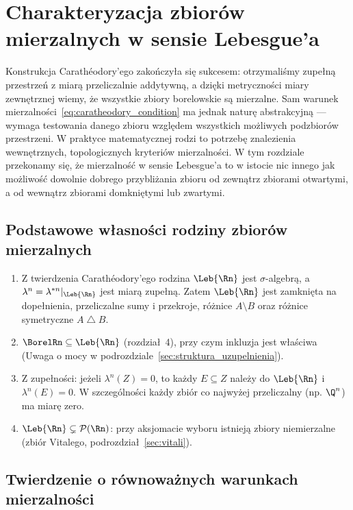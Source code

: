 \section{Charakteryzacja zbiorów mierzalnych w sensie Lebesgue'a}

Konstrukcja Carathéodory'ego zakończyła się sukcesem: otrzymaliśmy zupełną przestrzeń z miarą przeliczalnie addytywną, a dzięki metryczności miary zewnętrznej wiemy, że wszystkie zbiory borelowskie są mierzalne. Sam warunek mierzalności~\eqref{eq:caratheodory_condition} ma jednak naturę abstrakcyjną — wymaga testowania danego zbioru względem wszystkich możliwych podzbiorów przestrzeni. W praktyce matematycznej rodzi to potrzebę znalezienia wewnętrznych, topologicznych kryteriów mierzalności. W tym rozdziale przekonamy się, że mierzalność w sensie Lebesgue'a to w istocie nic innego jak możliwość dowolnie dobrego przybliżania zbioru od zewnątrz zbiorami otwartymi, a od wewnątrz zbiorami domkniętymi lub zwartymi.

\subsection{Podstawowe własności rodziny zbiorów mierzalnych}
\begin{uwaga}
    \leavevmode
    \begin{enumerate}
        \item Z twierdzenia Carathéodory'ego rodzina $\Leb{\Rn}$ jest $\sigma$-algebrą, a $\lambda^n = \lambda^{*n}|_{\Leb{\Rn}}$ jest miarą zupełną. Zatem $\Leb{\Rn}$ jest zamknięta na dopełnienia, przeliczalne sumy i przekroje, różnice $A \setminus B$ oraz różnice symetryczne $A \mathbin{\triangle} B$.
        \item $\BorelRn \subseteq \Leb{\Rn}$ (rozdział~4), przy czym inkluzja jest właściwa (Uwaga o mocy w podrozdziale~\ref{sec:struktura_uzupelnienia}).
        \item Z zupełności: jeżeli $\lambda^n(Z) = 0$, to każdy $E \subseteq Z$ należy do $\Leb{\Rn}$ i $\lambda^n(E) = 0$. W szczególności każdy zbiór co najwyżej przeliczalny (np. $\Q^n$) ma miarę zero.
        \item $\Leb{\Rn} \subsetneq \mathcal{P}(\Rn)$: przy aksjomacie wyboru istnieją zbiory niemierzalne (zbiór Vitalego, podrozdział~\ref{sec:vitali}).
    \end{enumerate}
\end{uwaga}

\subsection{Twierdzenie o równoważnych warunkach mierzalności}

